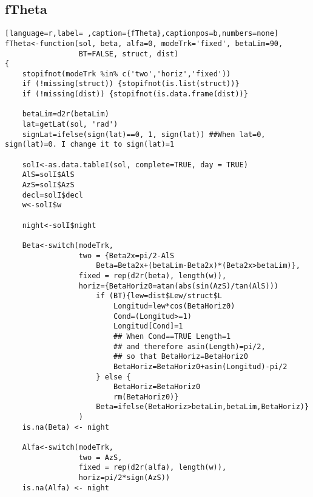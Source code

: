 \subsection{fTheta}
\label{sec:org6716682}
\label{subsec:ftheta}
\begin{lstlisting}[language=r,label= ,caption={fTheta},captionpos=b,numbers=none]
fTheta<-function(sol, beta, alfa=0, modeTrk='fixed', betaLim=90, 
                 BT=FALSE, struct, dist)
{
    stopifnot(modeTrk %in% c('two','horiz','fixed'))
    if (!missing(struct)) {stopifnot(is.list(struct))}
    if (!missing(dist)) {stopifnot(is.data.frame(dist))}

    betaLim=d2r(betaLim)
    lat=getLat(sol, 'rad')
    signLat=ifelse(sign(lat)==0, 1, sign(lat)) ##When lat=0, sign(lat)=0. I change it to sign(lat)=1

    solI<-as.data.tableI(sol, complete=TRUE, day = TRUE)
    AlS=solI$AlS
    AzS=solI$AzS
    decl=solI$decl
    w<-solI$w

    night<-solI$night

    Beta<-switch(modeTrk,
                 two = {Beta2x=pi/2-AlS	
                     Beta=Beta2x+(betaLim-Beta2x)*(Beta2x>betaLim)},
                 fixed = rep(d2r(beta), length(w)), 
                 horiz={BetaHoriz0=atan(abs(sin(AzS)/tan(AlS)))
                     if (BT){lew=dist$Lew/struct$L
                         Longitud=lew*cos(BetaHoriz0)
                         Cond=(Longitud>=1)
                         Longitud[Cond]=1
                         ## When Cond==TRUE Length=1
                         ## and therefore asin(Length)=pi/2,
                         ## so that BetaHoriz=BetaHoriz0
                         BetaHoriz=BetaHoriz0+asin(Longitud)-pi/2                                     
                     } else {
                         BetaHoriz=BetaHoriz0
                         rm(BetaHoriz0)}
                     Beta=ifelse(BetaHoriz>betaLim,betaLim,BetaHoriz)}
                 )
    is.na(Beta) <- night

    Alfa<-switch(modeTrk,
                 two = AzS,
                 fixed = rep(d2r(alfa), length(w)),
                 horiz=pi/2*sign(AzS))
    is.na(Alfa) <- night


\end{lstlisting}

